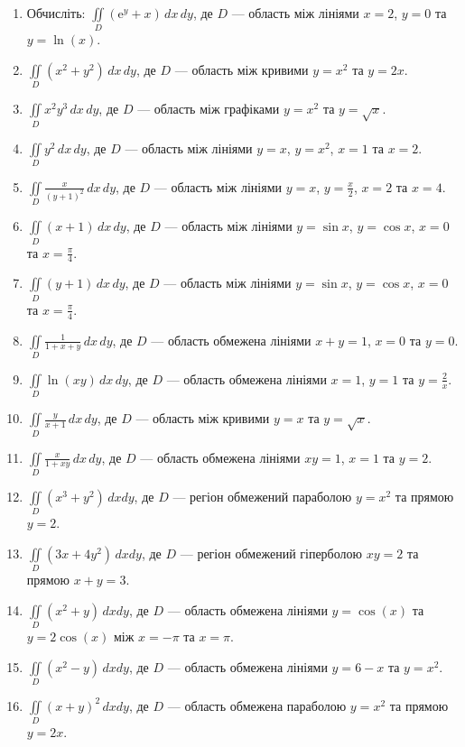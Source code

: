 \begin{enumerate}[label*=\arabic*.]
  \item Обчисліть: $\iint\limits_D \left({\mathrm e}^{y}+x\right)\,dx\,dy$, де $D$ --- область між лініями ${x = 2}$, ${y = 0}$ та ${y = \ln(x)}$.
  \item ${ \iint\limits_D \left(x^2 + y^2\right) \,dx \,dy }$, де ${ D }$ --- область між кривими ${ y = x^2 }$ та ${ y = 2x }$.
  \item ${ \iint\limits_D x^2y^3 \,dx \,dy }$, де ${ D }$ --- область між графіками ${ y = x^2 }$ та ${ y = \sqrt{x} }$.
  \item ${ \iint\limits_D y^2 \,dx \,dy }$, де ${ D }$ --- область між лініями ${ y = x }$, ${ y = x^2 }$, ${x = 1}$ та ${ x = 2 }$.
  \item ${ \iint\limits_D \frac{x}{\left(y+1\right)^{2}} \,dx \,dy }$, де ${ D }$ --- область між лініями ${ y = x }$, ${ y = \frac{x}{2} }$, ${x = 2}$ та ${ x = 4 }$.
  \item ${ \iint\limits_D (x + 1) \,dx \,dy }$, де ${ D }$ --- область між лініями ${ y = \sin x }$, ${ y = \cos x }$, ${x = 0}$ та ${ x = \frac{\pi}{4} }$.
  \item ${ \iint\limits_D (y + 1) \,dx \,dy }$, де ${ D }$ --- область між лініями ${ y = \sin x }$, ${ y = \cos x }$, ${x = 0}$ та ${ x = \frac{\pi}{4} }$.
  \item ${ \iint\limits_D \frac{1}{1+x+y} \,dx \,dy }$, де ${ D }$ --- область обмежена лініями ${ x + y = 1 }$, ${ x = 0 }$ та ${ y = 0 }$.
  \item ${ \iint\limits_D \ln(xy) \,dx \,dy }$, де ${ D }$ --- область обмежена лініями ${ x = 1 }$, ${ y = 1 }$ та ${ y = \frac{2}{x} }$.
  \item ${ \iint\limits_D \frac{y}{x+1} \,dx \,dy }$, де ${ D }$ --- область між кривими ${ y = x }$ та ${ y = \sqrt{x} }$.
  \item ${ \iint\limits_D \frac{x}{1+xy} \,dx \,dy }$, де ${ D }$ --- область обмежена лініями ${ xy = 1 }$, ${ x = 1 }$ та ${ y = 2 }$.
  \item ${ \iint\limits_D \left(x^{3}+y^{2}\right) \, dxdy }$, де ${ D }$ --- регіон обмежений параболою ${y = x^2}$ та прямою ${y = 2}$.
  \item ${ \iint\limits_D (3x + 4y^2) \, dxdy }$,  де ${ D }$ --- регіон обмежений гіперболою ${xy = 2}$ та прямою ${x + y = 3}$.
  \item ${ \iint\limits_D (x^2 + y) \, dxdy }$, де ${ D }$ --- область обмежена лініями ${y = \cos(x)}$ та ${y = 2\cos(x)}$ між ${x = -\pi}$ та ${x = \pi}$.
  \item ${ \iint\limits_D (x^2 - y) \, dxdy }$, де ${ D }$ --- область обмежена лініями ${y = 6 - x}$ та ${y = x^2}$.
  \item ${ \iint\limits_D \left(x + y\right)^2 \, dxdy }$, де ${ D }$ --- область обмежена параболою $y = x^2$ та прямою $y = 2x$.
\end{enumerate}
